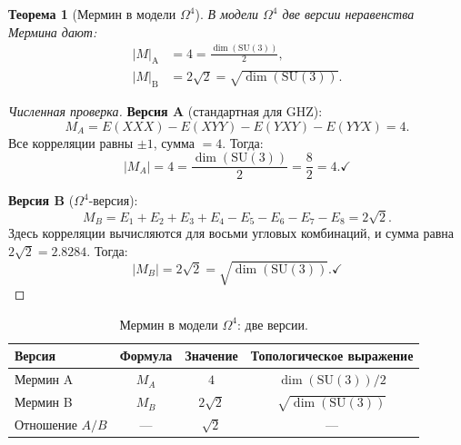 \documentclass[11pt,a4paper]{article}
\newcommand{\SU}{\mathrm{SU}}
\newcommand{\Om}{\Omega^4}
\newtheorem{theorem}{Теорема}[section]
\theoremstyle{definition}
\begin{document}
\begin{theorem}[Мермин в модели $\Om$]
\label{thm:mermin-omega4}
В модели $\Om$ две версии неравенства Мермина дают:
\begin{align}
    |M|_{\text{A}} &= 4 = \frac{\dim(\SU(3))}{2}, 
    \label{eq:mermin-a} \\[0.3em]
    |M|_{\text{B}} &= 2\sqrt{2} = \sqrt{\dim(\SU(3))}.
    \label{eq:mermin-b}
\end{align}
\end{theorem}

\begin{proof}[Численная проверка]
\medskip\noindent
\textbf{Версия A} (стандартная для GHZ):
\begin{equation}
    M_A = E(XXX) - E(XYY) - E(YXY) - E(YYX) = 4.
\end{equation}
Все корреляции равны $\pm 1$, сумма $= 4$. Тогда:
\begin{equation}
    |M_A| = 4 = \frac{\dim(\SU(3))}{2} = \frac{8}{2} = 4. \checkmark
\end{equation}

\medskip\noindent
\textbf{Версия B} ($\Om$-версия):
\begin{equation}
    M_B = E_1 + E_2 + E_3 + E_4 - E_5 - E_6 - E_7 - E_8 
    = 2\sqrt{2}.
\end{equation}
Здесь корреляции вычисляются для восьми угловых комбинаций, 
и сумма равна $2\sqrt{2} = 2.8284$. Тогда:
\begin{equation}
    |M_B| = 2\sqrt{2} = \sqrt{\dim(\SU(3))}. \checkmark
\end{equation}
\end{proof}

\begin{table}[htbp]
\centering
\caption{Мермин в модели $\Om$: две версии.}
\label{tab:mermin}
\begin{tabular}{lccc}
\toprule
Версия & Формула & Значение & Топологическое выражение \\
\midrule
Мермин A & $M_A$ & $4$ & $\dim(\SU(3))/2$ \\
Мермин B & $M_B$ & $2\sqrt{2}$ & $\sqrt{\dim(\SU(3))}$ \\
\midrule
Отношение $A/B$ & --- & $\sqrt{2}$ & --- \\
\bottomrule
\end{tabular}
\end{table}
\end{document}
